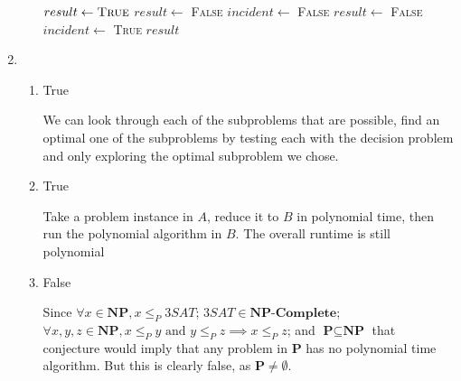 \documentclass[12pt,letterpaper]{article}
\begin{document}
\begin{enumerate}
\begin{enumerate}
          \begin{algorithm}
            \begin{algorithmic}
                \State $result \gets \textsc{True}$
                  \State $result \gets$ \textsc{False}
                \Else
                    \State $incident \gets$ \textsc{False}
                        \State $result \gets$ \textsc{False}
                        \State $incident \gets$ \textsc{True}
                      \EndIf
                    \EndFor
                  \EndFor
                \EndIf
                \State \Return $result$
              \EndFunction
            \end{algorithmic}
          \end{algorithm}

      \end{enumerate}

    \item
      \begin{enumerate}
        \item True

          We can look through each of the subproblems that are possible,
          find an optimal one of the subproblems by testing each with the decision problem
          and only exploring the optimal subproblem we chose.

        \item True

          Take a problem instance in $A$,
          reduce it to $B$ in polynomial time,
          then run the polynomial algorithm in $B$.
          The overall runtime is still polynomial

        \item False

          Since
          $\forall x \in \textbf{NP}, x \le_{P} 3SAT$;
          $3SAT \in \textbf{NP-Complete}$;
          $\forall x, y, z \in \textbf{NP}, x \le_{P} y \text{ and } y \le_{P} z \implies x \le_{P} z$; and
          $\textbf{P} \subseteq \textbf{NP}$ that conjecture would imply that
          any problem in \textbf{P} has no polynomial time algorithm.
          But this is clearly false, as $\textbf{P} \ne \emptyset$.
      \end{enumerate}
  \end{enumerate}
\end{document}
